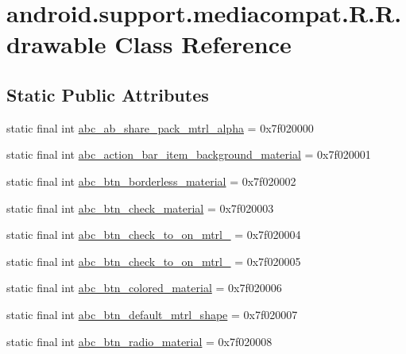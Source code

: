 \hypertarget{classandroid_1_1support_1_1mediacompat_1_1_r_1_1drawable}{
\section{android.support.mediacompat.R.R.drawable Class Reference}
\label{classandroid_1_1support_1_1mediacompat_1_1_r_1_1drawable}
}
\subsection*{Static Public Attributes}
\begin{CompactItemize}
\item 
static final int \hyperlink{classandroid_1_1support_1_1mediacompat_1_1_r_1_1drawable_5be578267444beeb385e912309e97d82}{abc\_\-ab\_\-share\_\-pack\_\-mtrl\_\-alpha} = 0x7f020000
\item 
static final int \hyperlink{classandroid_1_1support_1_1mediacompat_1_1_r_1_1drawable_c136693b9fe0e6f062862095959b930e}{abc\_\-action\_\-bar\_\-item\_\-background\_\-material} = 0x7f020001
\item 
static final int \hyperlink{classandroid_1_1support_1_1mediacompat_1_1_r_1_1drawable_69ab58ca7763ab923fec6405964fd968}{abc\_\-btn\_\-borderless\_\-material} = 0x7f020002
\item 
static final int \hyperlink{classandroid_1_1support_1_1mediacompat_1_1_r_1_1drawable_0cd5f83a2eb70aeee246ee5195996a84}{abc\_\-btn\_\-check\_\-material} = 0x7f020003
\item 
static final int \hyperlink{classandroid_1_1support_1_1mediacompat_1_1_r_1_1drawable_a1561f62316c5b95c784c75615f6b156}{abc\_\-btn\_\-check\_\-to\_\-on\_\-mtrl\_} = 0x7f020004
\item 
static final int \hyperlink{classandroid_1_1support_1_1mediacompat_1_1_r_1_1drawable_9e89a02c3ee93740e9a3e5d4fb473388}{abc\_\-btn\_\-check\_\-to\_\-on\_\-mtrl\_} = 0x7f020005
\item 
static final int \hyperlink{classandroid_1_1support_1_1mediacompat_1_1_r_1_1drawable_21488122f1d67815a33dd7c36a96d893}{abc\_\-btn\_\-colored\_\-material} = 0x7f020006
\item 
static final int \hyperlink{classandroid_1_1support_1_1mediacompat_1_1_r_1_1drawable_dc2f9e27fc25455bb0fc983ba7d0d49b}{abc\_\-btn\_\-default\_\-mtrl\_\-shape} = 0x7f020007
\item 
static final int \hyperlink{classandroid_1_1support_1_1mediacompat_1_1_r_1_1drawable_c9fad2cb3536727dc9fa9e28efca7194}{abc\_\-btn\_\-radio\_\-material} = 0x7f020008

\end{CompactItemize}
